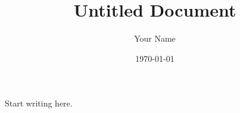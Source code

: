 \documentclass[11pt]{article}
\title{Untitled Document}
\author{Your Name}
\date{\today}
\begin{document}
\maketitle

Start writing here.
\end{document}
